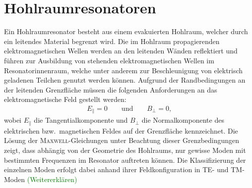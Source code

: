 \documentclass[11pt, a4paper]{scrbook}
\newcommand{\todo}[1]{{\textcolor{Green}{(#1)}}}
\begin{document}
	\section{Hohlraumresonatoren}
	Ein Hohlraumresonator besteht aus einem evakuierten Hohlraum, welcher durch ein leitendes Material begrenzt wird.
	Die im Hohlraum propagierenden elektromagnetischen Wellen werden an den leitenden Wänden reflektiert und führen zur Ausbildung von stehenden elektromagnetischen Wellen im Resonatorinnenraum, welche unter anderem zur Beschleunigung von elektrisch geladenen Teilchen genutzt werden können.
	Aufgrund der Randbedingungen an der leitenden Grenzfläche müssen die folgenden Anforderungen an das elektromagnetische Feld gestellt werden:
	\begin{align}
		E_\parallel = 0 \qquad \text{und} \qquad B_\perp = 0\text{,}
	\end{align}
	wobei $E_\parallel$ die Tangentialkomponente und $B_\perp$ die Normalkomponente des elektrischen bzw.\ magnetischen Feldes auf der Grenzfläche kennzeichnet.
	Die Lösung der \textsc{Maxwell}-Gleichungen unter Beachtung dieser Grenzbedingungen zeigt, dass abhängig von der Geometrie des Hohlraums, nur gewisse Moden mit bestimmten Frequenzen im Resonator auftreten können.
	Die Klassifizierung der einzelnen Moden erfolgt dabei anhand ihrer Feldkonfiguration in TE- und TM-Moden \todo{Weitererklären}
	
\end{document}
